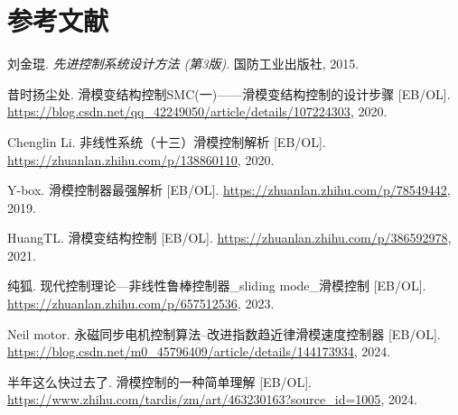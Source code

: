 \documentclass[12pt]{article}
\begin{document}
\section{参考文献}
\begin{thebibliography}{99}

    刘金琨. \textit{先进控制系统设计方法 (第3版)}. 国防工业出版社, 2015.
    
    昔时扬尘处. 滑模变结构控制SMC(一)——滑模变结构控制的设计步骤 [EB/OL]. 
    \url{https://blog.csdn.net/qq_42249050/article/details/107224303}, 2020.
    
    Chenglin Li. 非线性系统（十三）滑模控制解析 [EB/OL]. 
    \url{https://zhuanlan.zhihu.com/p/138860110}, 2020.
    
    Y-box. 滑模控制器最强解析 [EB/OL]. 
    \url{https://zhuanlan.zhihu.com/p/78549442}, 2019.
    
    HuangTL. 滑模变结构控制 [EB/OL]. 
    \url{https://zhuanlan.zhihu.com/p/386592978}, 2021.
    
    纯狐. 现代控制理论—非线性鲁棒控制器\_sliding mode\_滑模控制 [EB/OL]. 
    \url{https://zhuanlan.zhihu.com/p/657512536}, 2023.
    
    Neil motor. 永磁同步电机控制算法--改进指数趋近律滑模速度控制器 [EB/OL]. 
    \url{https://blog.csdn.net/m0_45796409/article/details/144173934}, 2024.
    
    半年这么快过去了. 滑模控制的一种简单理解 [EB/OL]. 
    \url{https://www.zhihu.com/tardis/zm/art/463230163?source_id=1005}, 2024.
    
    \end{thebibliography}
\end{document}
